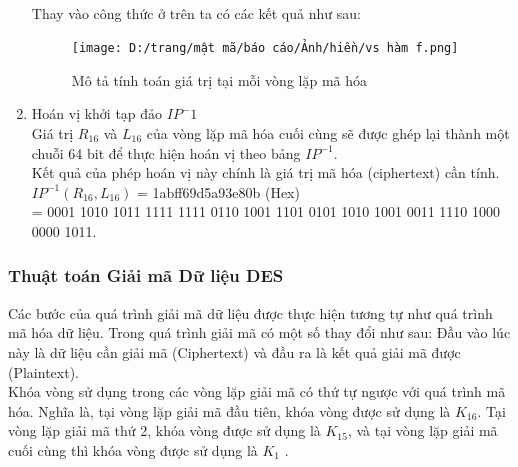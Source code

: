 \begin{enumerate}
\[\begin{gathered}
\end{gathered} \]
    Thay vào công thức ở trên ta có các kết quả như sau:
    \begin{figure}[H]
        \centering
        \texttt{[image: D:/trang/mật mã/báo cáo/Ảnh/hiền/vs hàm f.png]}
        \caption{Mô tả tính toán giá trị tại mỗi vòng lặp mã hóa}
    \end{figure}
    \item Hoán vị khởi tạp đảo $IP^-1$\\
    Giá trị $R_{16}$ và $L_{16}$ của vòng lặp mã hóa cuối cùng sẽ được ghép lại thành một chuỗi 64 bit để thực hiện hoán vị theo bảng $IP^{-1}$.\\
    Kết quả của phép hoán vị này chính là giá trị mã hóa (ciphertext) cần tính.\\
    $IP^{-1}(R_{16}, L_{16})$ = 1abff69d5a93e80b (Hex)\\
    = 0001 1010 1011 1111 1111 0110 1001 1101 0101 1010 1001 0011 1110 1000 0000 1011.

\end{enumerate}
\subsubsection{Thuật toán Giải mã Dữ liệu DES}
Các bước của quá trình giải mã dữ liệu được thực hiện tương tự như quá trình mã hóa dữ liệu. Trong quá trình giải mã có một số thay đổi như sau: 
Đầu vào lúc này là dữ liệu cần giải mã (Ciphertext) và đầu ra là kết quả giải mã được (Plaintext).\\
\indent Khóa vòng sử dụng trong các vòng lặp giải mã có thứ tự ngược với quá trình mã hóa. Nghĩa là, tại vòng lặp giải mã đầu tiên, khóa vòng được sử dụng là $K_{16}$. Tại vòng lặp giải mã thứ 2, khóa vòng được sử dụng là $K_{15}$, và tại vòng lặp giải mã cuối cùng thì khóa vòng được sử dụng là $K_1$ \cite{quan2020}.
